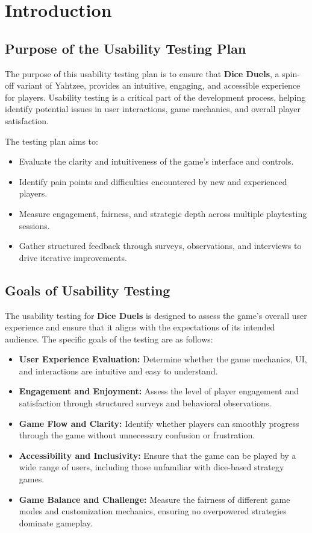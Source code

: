 \documentclass{article}
\date{}
\begin{document}
\newpage
\section{Introduction}

\subsection{Purpose of the Usability Testing Plan}
The purpose of this usability testing plan is to ensure that \textbf{Dice Duels}, a spin-off variant of Yahtzee, provides an intuitive, engaging, and accessible experience for players. Usability testing is a critical part of the development process, helping identify potential issues in user interactions, game mechanics, and overall player satisfaction. 

The testing plan aims to:
\begin{itemize}
    \item Evaluate the clarity and intuitiveness of the game's interface and controls.
    \item Identify pain points and difficulties encountered by new and experienced players.
    \item Measure engagement, fairness, and strategic depth across multiple playtesting sessions.
    \item Gather structured feedback through surveys, observations, and interviews to drive iterative improvements.
\end{itemize}

\subsection{Goals of Usability Testing}
The usability testing for \textbf{Dice Duels} is designed to assess the game’s overall user experience and ensure that it aligns with the expectations of its intended audience. The specific goals of the testing are as follows:

\begin{itemize}
    \item \textbf{User Experience Evaluation:} Determine whether the game mechanics, UI, and interactions are intuitive and easy to understand.
    \item \textbf{Engagement and Enjoyment:} Assess the level of player engagement and satisfaction through structured surveys and behavioral observations.
    \item \textbf{Game Flow and Clarity:} Identify whether players can smoothly progress through the game without unnecessary confusion or frustration.
    \item \textbf{Accessibility and Inclusivity:} Ensure that the game can be played by a wide range of users, including those unfamiliar with dice-based strategy games.
    \item \textbf{Game Balance and Challenge:} Measure the fairness of different game modes and customization mechanics, ensuring no overpowered strategies dominate gameplay.
\end{itemize}
\end{document}

